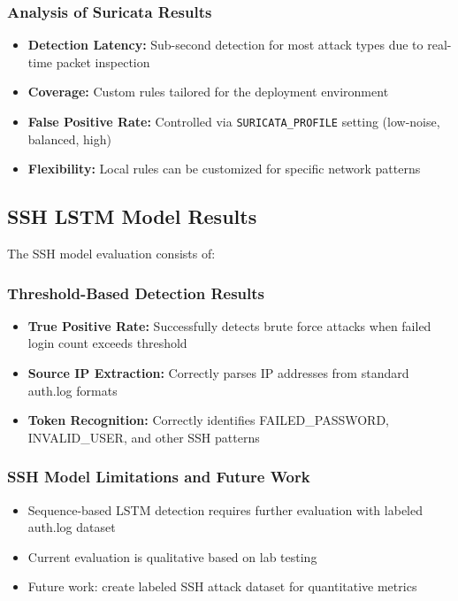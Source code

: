 \documentclass[12pt,a4paper]{report} %
\begin{document}
\subsubsection{Analysis of Suricata Results}
\begin{itemize}
	\item \textbf{Detection Latency:} Sub-second detection for most attack types due to real-time packet inspection
	\item \textbf{Coverage:} Custom rules tailored for the deployment environment
	\item \textbf{False Positive Rate:} Controlled via \texttt{SURICATA\_PROFILE} setting (low-noise, balanced, high)
	\item \textbf{Flexibility:} Local rules can be customized for specific network patterns
\end{itemize}

\subsection{SSH LSTM Model Results}
The SSH model evaluation consists of:

\subsubsection{Threshold-Based Detection Results}
\begin{itemize}
	\item \textbf{True Positive Rate:} Successfully detects brute force attacks when failed login count exceeds threshold
	\item \textbf{Source IP Extraction:} Correctly parses IP addresses from standard auth.log formats
	\item \textbf{Token Recognition:} Correctly identifies FAILED\_PASSWORD, INVALID\_USER, and other SSH patterns
\end{itemize}

\subsubsection{SSH Model Limitations and Future Work}
\begin{itemize}
	\item Sequence-based LSTM detection requires further evaluation with labeled auth.log dataset
	\item Current evaluation is qualitative based on lab testing
	\item Future work: create labeled SSH attack dataset for quantitative metrics
\end{itemize}
\end{document}
